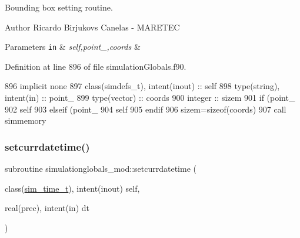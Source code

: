 Bounding box setting routine. 

\begin{DoxyAuthor}{Author}
Ricardo Birjukovs Canelas -\/ M\+A\+R\+E\+T\+EC 
\end{DoxyAuthor}

\begin{DoxyParams}[1]{Parameters}
\mbox{\tt in}  & {\em self,point\+\_\+,coords} & \\
\hline
\end{DoxyParams}


Definition at line 896 of file simulation\+Globals.\+f90.


\begin{DoxyCode}
896     \textcolor{keywordtype}{implicit none}
897     \textcolor{keywordtype}{class}(simdefs\_t), \textcolor{keywordtype}{intent(inout)} :: self
898     \textcolor{keywordtype}{type}(string), \textcolor{keywordtype}{intent(in)} :: point\_
899     \textcolor{keywordtype}{type}(vector) :: coords
900     \textcolor{keywordtype}{integer} :: sizem
901     \textcolor{keywordflow}{if} (point\_%
902         self%
903     \textcolor{keywordflow}{elseif} (point\_%
904         self%
905 \textcolor{keywordflow}{    endif}
906     sizem=sizeof(coords)
907     \textcolor{keyword}{call }simmemory%
\end{DoxyCode}
\mbox{\label{namespacesimulationglobals__mod_acbb28eee5547a03dc28c924d8e23ad9a}} 
\subsubsection{\texorpdfstring{setcurrdatetime()}{setcurrdatetime()}}
{\footnotesize\ttfamily subroutine simulationglobals\+\_\+mod\+::setcurrdatetime (\begin{DoxyParamCaption}\item[{class(\mbox{\hyperlink{structsimulationglobals__mod_1_1sim__time__t}{sim\+\_\+time\+\_\+t}}), intent(inout)}]{self,  }\item[{real(prec), intent(in)}]{dt }\end{DoxyParamCaption})\hspace{0.3cm}{\ttfamily [private]}}



